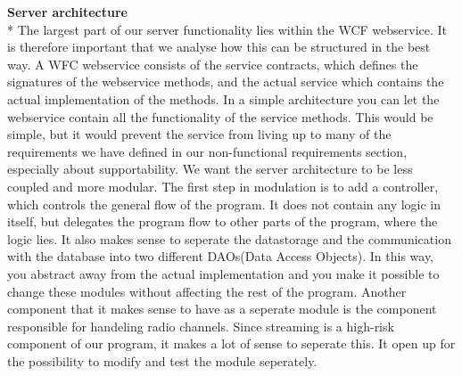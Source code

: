 \documentclass[a4paper,11pt,report]{article}
\begin{document}
{\textbf{Server architecture} \\*
The largest part of our server functionality lies within the WCF webservice. It is therefore important that we analyse how this can be structured in the best way.
A WFC webservice consists of the service contracts, which defines the signatures of the webservice methods, and the actual service which contains the actual implementation of the methods. In a simple architecture you can let the webservice contain all the functionality of the service methods. This would be simple, but it would prevent the service from living up to many of the requirements we have defined in our non-functional requirements section, especially about supportability. We want the server architecture to be less coupled and more modular. The first step in modulation is to add a controller, which controls the general flow of the program. It does not contain any logic in itself, but delegates the program flow to other parts of the program, where the logic lies. It also makes sense to seperate the datastorage and the communication with the database into two different DAOs(Data Access Objects). In this way, you abstract away from the actual implementation and you make it possible to change these modules without affecting the rest of the program. Another component that it makes sense to have as a seperate module is the component responsible for handeling radio channels. Since streaming is a high-risk component of our program, it makes a lot of sense to seperate this. It open up for the possibility to modify and test the module seperately. 

}
\end{document}

